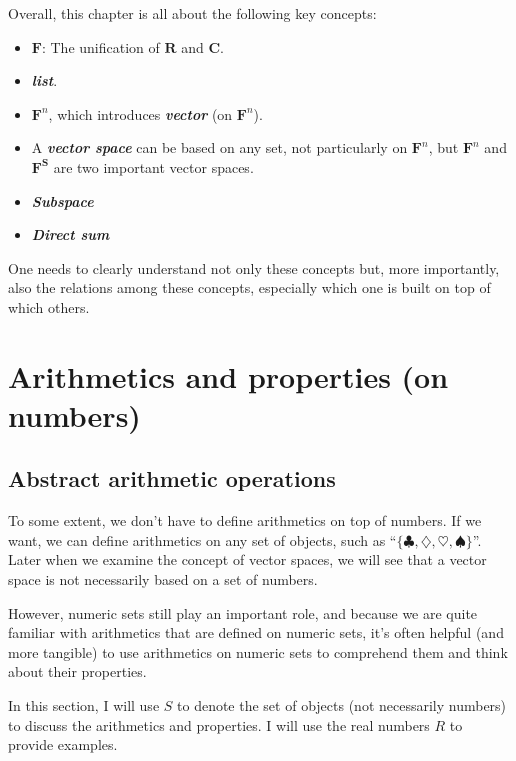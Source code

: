 \documentclass[12pt, letterpaper, oneside]{book}
\begin{document}
Overall, this chapter is all about the following key concepts:

\begin{itemize}
  \item $\mathbf{F}$: The unification of $\mathbf{R}$ and $\mathbf{C}$.
  \item \textbf{\textit{list}}.
  \item $\mathbf{F}^n$, which introduces \textbf{\textit{vector}} (on
    $\mathbf{F}^n$).
  \item A \textbf{\textit{vector space}} can be based on any set, not
    particularly on $\mathbf{F}^n$, but $\mathbf{F}^n$ and $\mathbf{F^S}$ are
    two important vector spaces.
  \item \textbf{\textit{Subspace}}
  \item \textbf{\textit{Direct sum}}
\end{itemize}

One needs to clearly understand not only these concepts but, more importantly,
also the relations among these concepts, especially which one is built on top
of which others.

\section{Arithmetics and properties (on numbers)}

\subsection{Abstract arithmetic operations}

To some extent, we don't have to define arithmetics on top of numbers. If we
want, we can define arithmetics on any set of objects, such as ``$\{ \clubsuit,
\diamondsuit, \heartsuit, \spadesuit \}$''. Later when we examine the concept
of vector spaces, we will see that a vector space is not necessarily based on a
set of numbers.

However, numeric sets still play an important role, and because we are quite
familiar with arithmetics that are defined on numeric sets, it's often helpful
(and more tangible) to use arithmetics on numeric sets to comprehend them and
think about their properties.

In this section, I will use $S$ to denote the set of objects (not necessarily
numbers) to discuss the arithmetics and properties. I will use the real numbers
$R$ to provide examples.
\end{document}

